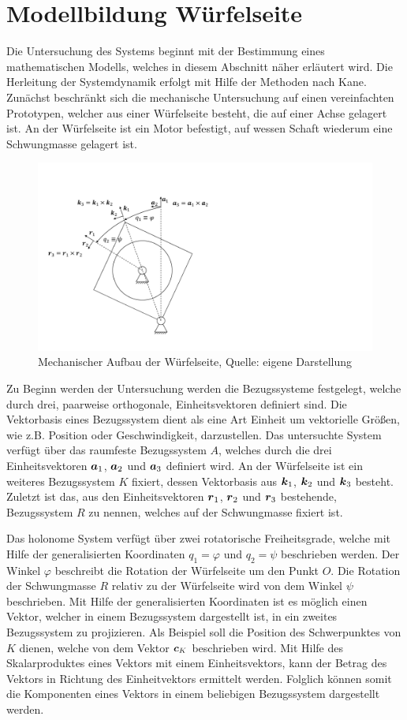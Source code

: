 \section{Modellbildung Würfelseite}
Die Untersuchung des Systems beginnt mit der Bestimmung eines mathematischen Modells, welches in diesem Abschnitt näher erläutert wird. Die Herleitung der Systemdynamik erfolgt mit Hilfe der Methoden nach Kane. Zunächst beschränkt sich die mechanische Untersuchung auf einen vereinfachten Prototypen, welcher aus einer Würfelseite besteht, die auf einer Achse gelagert ist. An der Würfelseite ist ein Motor befestigt, auf wessen Schaft wiederum eine Schwungmasse gelagert ist.

\begin{figure}[!h]
\centering
\includegraphics[width=0.6\linewidth, trim={1cm 1.5cm 18cm 3.5cm}, clip]{2_ModellWuerfelseite/img/ModellWuerfelseite}
\caption{Mechanischer Aufbau der Würfelseite, Quelle: eigene Darstellung}
\end{figure}

Zu Beginn werden der Untersuchung werden die Bezugssysteme festgelegt, welche durch drei, paarweise orthogonale, Einheitsvektoren definiert sind. Die Vektorbasis eines Bezugssystem dient als eine Art Einheit um vektorielle Größen, wie z.B. Position oder Geschwindigkeit, darzustellen. Das untersuchte System verfügt über das raumfeste Bezugssystem $A$, welches durch die drei Einheitsvektoren $\boldsymbol{a}_1$, $\boldsymbol{a}_2$ und $\boldsymbol{a}_3$ definiert wird. An der Würfelseite ist ein weiteres Bezugssystem $K$ fixiert, dessen Vektorbasis aus $\boldsymbol{k}_1$, $\boldsymbol{k}_2$ und $\boldsymbol{k}_3$ besteht. Zuletzt ist das, aus den Einheitsvektoren $\boldsymbol{r}_1$, $\boldsymbol{r}_2$ und $\boldsymbol{r}_3$ bestehende, Bezugssystem $R$ zu nennen, welches auf der Schwungmasse fixiert ist. 

Das holonome System verfügt über zwei rotatorische Freiheitsgrade, welche mit Hilfe der generalisierten Koordinaten $q_1 = \varphi$ und $q_2 = \psi$ beschrieben werden. Der Winkel $\varphi$ beschreibt die Rotation der Würfelseite um den Punkt $O$. Die Rotation der Schwungmasse $R$ relativ zu der Würfelseite wird von dem Winkel $\psi$ beschrieben. Mit Hilfe der generalisierten Koordinaten ist es möglich einen Vektor, welcher in einem Bezugssystem dargestellt ist, in ein zweites Bezugssystem zu projizieren. Als Beispiel soll die Position des Schwerpunktes von $K$ dienen, welche von dem Vektor $\boldsymbol{c}_K$ beschrieben wird. Mit Hilfe des Skalarproduktes eines Vektors mit einem Einheitsvektors, kann der Betrag des Vektors in Richtung des Einheitvektors ermittelt werden. Folglich können somit die Komponenten eines Vektors in einem beliebigen Bezugssystem dargestellt werden.

